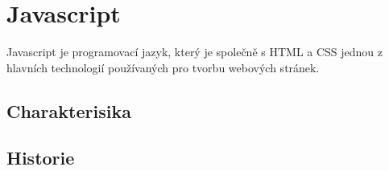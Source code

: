 \documentclass[main.tex]{subfiles}
\begin{document}
\section{Javascript}
Javascript je programovací jazyk, který je společně s HTML a CSS jednou z hlavních technologií používaných pro tvorbu webových stránek.

\subsection{Charakterisika}



\subsection{Historie}
\end{document}
